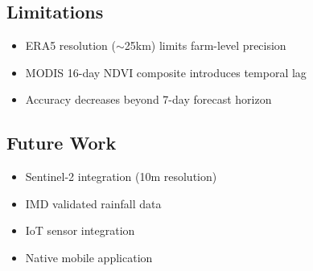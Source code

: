 \documentclass[conference,11pt]{IEEEtran}
\begin{document}
\subsection{Limitations}
\begin{itemize}
    \item ERA5 resolution ($\sim$25km) limits farm-level precision
    \item MODIS 16-day NDVI composite introduces temporal lag
    \item Accuracy decreases beyond 7-day forecast horizon
\end{itemize}

\subsection{Future Work}
\begin{itemize}
    \item Sentinel-2 integration (10m resolution)
    \item IMD validated rainfall data
    \item IoT sensor integration
    \item Native mobile application
\end{itemize}
\end{document}
